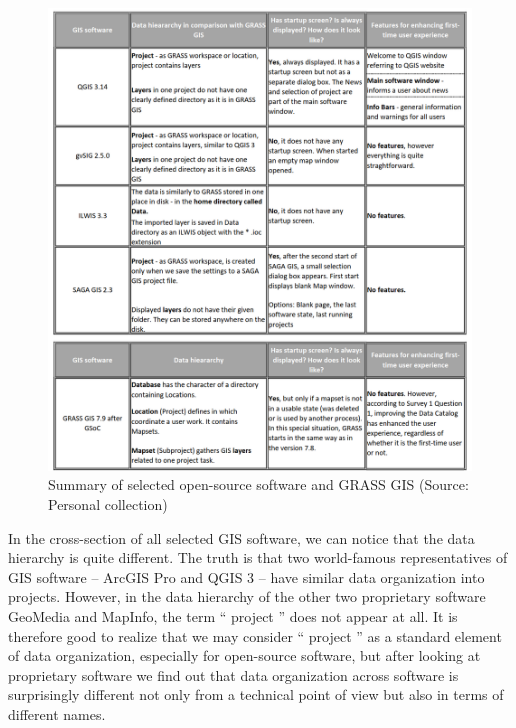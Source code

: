 \documentclass[a4paper,10pt,twoside]{article}
\begin{document}
\vspace{0.3cm}
\begin{figure}[hbt!] 
\begin{center}
\includegraphics[width=15cm]{../pictures/open-source_software.png} 
\caption[Summary of selected open-source software and GRASS GIS]{Summary of selected open-source software and GRASS GIS (Source: Personal collection)}
\label{fig:open-source_software}
\end{center}
\end{figure}


\noindent In the cross-section of all selected GIS software, we can notice that the data hierarchy is quite different. The truth is that two world-famous representatives of GIS software -- ArcGIS Pro and QGIS 3 -- have similar data organization into projects. However, in the data hierarchy of the other two proprietary software GeoMedia and MapInfo, the term `` project '' does not appear at all. It is therefore good to realize that we may consider `` project '' as a standard element of data organization, especially for open-source software, but after looking at proprietary software we find out that data organization across software is surprisingly different not only from a technical point of view but also in terms of different names.
\end{document}
